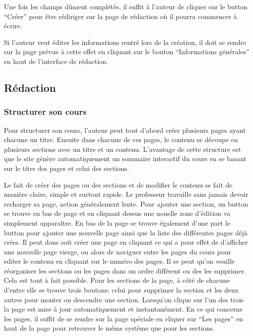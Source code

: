 \documentclass[letterpaper,10pt,english]{sphinxmanual}
\begin{document}
Une fois les champs dûment complétés, il suffit à l'auteur de cliquer sur le button ``Créer'' pour être rédiriger sur la page de rédaction où il pourra commencer à écrire.

Si l'auteur veut éditer les informations rentré lors de la création, il doit se rendre sur la page prévue à cette effet en cliquant sur le bouton ``Informations générales'' en haut de l'interface de rédaction.


\subsection{Rédaction}
\label{functionalities:redaction}

\subsubsection{Structurer son cours}
\label{functionalities:structurer-son-cours}
Pour structurer son cours, l'auteur peut tout d'abord créer plusieurs pages ayant chacune un titre. Ensuite dans chacune de ces pages, le contenu se découpe en plusieurs sections avec un titre et un contenu. L'avantage de cette structure est que le site génère automatiquement un sommaire interactif du cours en se basant sur le titre des pages et celui des sections.

Le fait de créer des pages ou des sections et de modifier le contenu se fait de manière claire, simple et surtout rapide. Le professeur travaille sans jamais devoir recharger sa page, action généralement lente. Pour ajouter une section, un button se trouve en bas de page et en cliquant dessus une nouelle zone d'édition va simplement apparaître. En bas de la page se trouve également d'une part le button pour ajouter une nouvelle page ainsi que la liste des différentes pages déjà crées. Il peut donc soit créer une page en cliquant ce qui a pour effet de d'afficher une nouvelle page vierge, ou alors de naviguer entre les pages du cours pour editer le contenu en cliquant sur le numéro des pages. Il se peut qu'on veuille réorganiser les sections ou les pages dans un ordre différent ou des les supprimer. Cela est tout à fait possible. Pour les sections de la page, à côté de chacune d'entre elle se trouve trois boutons: celui pour supprimer la section et les deux autres pour monter ou descendre une section. Lorsqu'on clique sur l'un des trois la page est mise à jour automatiquement et instantanément. En ce qui concerne les pages, il suffit de se rendre sur la page spéciale en cliquer sur ``Les pages'' en haut de la page pour retrouver le même système que pour les sections.
\end{document}
